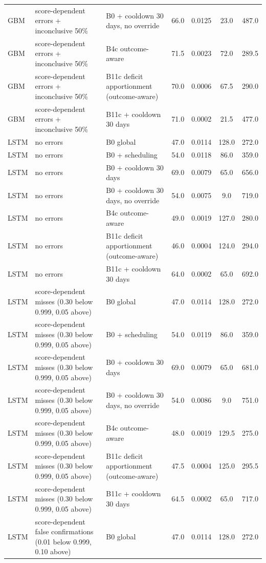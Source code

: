 \documentclass[10pt,onecolumn,letterpaper]{article}
\begin{document}
\begin{longtable}{lp{5.2cm}p{4.4cm}cccc}
GBM & score-dependent errors + inconclusive 50\% & B0 + cooldown 30 days, no override & 66.0 & 0.0125 & 23.0 & 487.0 \\
GBM & score-dependent errors + inconclusive 50\% & B4c outcome-aware & 71.5 & 0.0023 & 72.0 & 289.5 \\
GBM & score-dependent errors + inconclusive 50\% & B11c deficit apportionment (outcome-aware) & 70.0 & 0.0006 & 67.5 & 290.0 \\
GBM & score-dependent errors + inconclusive 50\% & B11c + cooldown 30 days & 71.0 & 0.0002 & 21.5 & 477.0 \\
LSTM & no errors & B0 global & 47.0 & 0.0114 & 128.0 & 272.0 \\
LSTM & no errors & B0 + scheduling & 54.0 & 0.0118 & 86.0 & 359.0 \\
LSTM & no errors & B0 + cooldown 30 days & 69.0 & 0.0079 & 65.0 & 656.0 \\
LSTM & no errors & B0 + cooldown 30 days, no override & 54.0 & 0.0075 & 9.0 & 719.0 \\
LSTM & no errors & B4c outcome-aware & 49.0 & 0.0019 & 127.0 & 280.0 \\
LSTM & no errors & B11c deficit apportionment (outcome-aware) & 46.0 & 0.0004 & 124.0 & 294.0 \\
LSTM & no errors & B11c + cooldown 30 days & 64.0 & 0.0002 & 65.0 & 692.0 \\
LSTM & score-dependent misses (0.30 below 0.999, 0.05 above) & B0 global & 47.0 & 0.0114 & 128.0 & 272.0 \\
LSTM & score-dependent misses (0.30 below 0.999, 0.05 above) & B0 + scheduling & 54.0 & 0.0119 & 86.0 & 359.0 \\
LSTM & score-dependent misses (0.30 below 0.999, 0.05 above) & B0 + cooldown 30 days & 69.0 & 0.0079 & 65.0 & 681.0 \\
LSTM & score-dependent misses (0.30 below 0.999, 0.05 above) & B0 + cooldown 30 days, no override & 54.0 & 0.0086 & 9.0 & 751.0 \\
LSTM & score-dependent misses (0.30 below 0.999, 0.05 above) & B4c outcome-aware & 48.0 & 0.0019 & 129.5 & 275.0 \\
LSTM & score-dependent misses (0.30 below 0.999, 0.05 above) & B11c deficit apportionment (outcome-aware) & 47.5 & 0.0004 & 125.0 & 295.5 \\
LSTM & score-dependent misses (0.30 below 0.999, 0.05 above) & B11c + cooldown 30 days & 64.5 & 0.0002 & 65.0 & 717.0 \\
LSTM & score-dependent false confirmations (0.01 below 0.999, 0.10 above) & B0 global & 47.0 & 0.0114 & 128.0 & 272.0 \\

\end{longtable}
\end{document}

